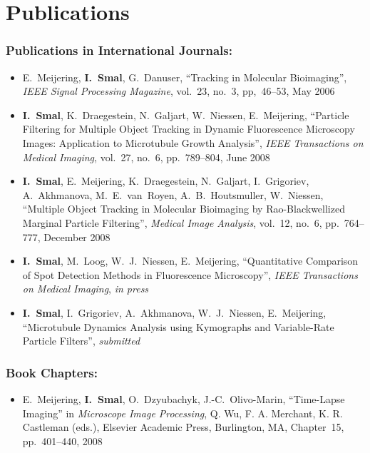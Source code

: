 %
%

\noquote
\orgchpos
\chapter*{Publications}
\label{publications}

\small
\normalsize

\subsection*{Publications in International Journals:}
\vspace{1ex}
\begin{itemize}
\item E.~Meijering, \textbf{I.~Smal}, G.~Danuser, ``Tracking in Molecular
  Bioimaging'', \emph{IEEE Signal Processing Magazine},
  vol.~23, no.~3, pp,~46--53, May 2006

\item \textbf{I.~Smal}, K.~Draegestein, N.~Galjart, W.~Niessen, E.~Meijering,
  ``Particle Filtering for Multiple Object Tracking in Dynamic 
Fluorescence Microscopy Images: Application to Microtubule Growth
Analysis'', \emph{IEEE Transactions on Medical Imaging}, vol.~27, no.~6, pp.~789--804, June 2008

\item \textbf{I.~Smal}, E.~Meijering, K.~Draegestein, N.~Galjart, I.~Grigoriev,
  A.~Akhmanova, M.~E.~van~Royen, A.~B.~Houtsmuller, W.~Niessen, 
``Multiple Object Tracking in Molecular Bioimaging by
Rao-Blackwellized Marginal Particle Filtering'',
\emph{Medical Image Analysis}, vol.~12, no.~6, pp.~764--777, December
2008

\item \textbf{I.~Smal}, M.~Loog,  W.~J.~Niessen, E.~Meijering,
``Quantitative Comparison of Spot Detection Methods in Fluorescence
Microscopy'', \emph{IEEE Transactions on Medical Imaging},  \emph{in press}

\item \textbf{I.~Smal}, I.~Grigoriev, A.~Akhmanova, W.~J.~Niessen, E.~Meijering,
``Microtubule Dynamics Analysis using Kymographs and Variable-Rate Particle
  Filters'', \emph{submitted}
\end{itemize}

\subsection*{Book Chapters:}
\vspace{1ex}
\begin{itemize}
\item E.~Meijering, \textbf{I.~Smal}, O.~Dzyubachyk, J.-C.~Olivo-Marin,
  ``Time-Lapse Imaging'' in \emph{Microscope Image Processing}, Q. Wu,
  F. A. Merchant, K. R. Castleman (eds.), Elsevier Academic Press,
  Burlington, MA, Chapter~15, pp.~401--440, 2008
\end{itemize}




